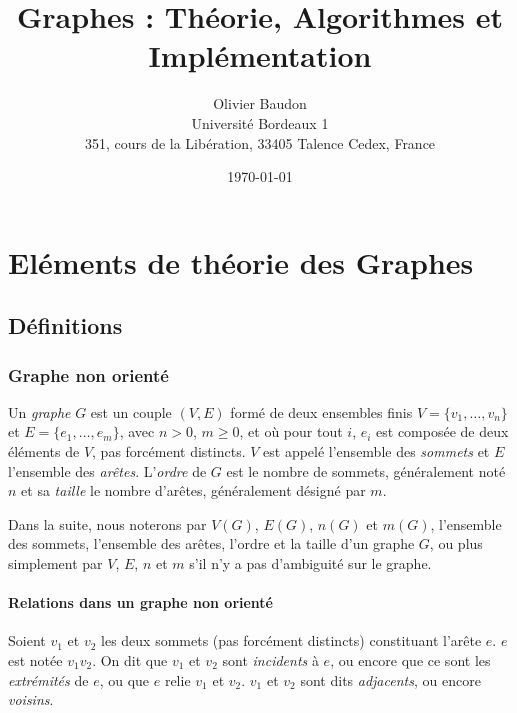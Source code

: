 \documentclass[11pt,a4paper]{report}
\title{Graphes : Théorie, Algorithmes et Implémentation}
\author{Olivier Baudon\\
Université Bordeaux 1\\ 
351, cours de la Libération, 33405 Talence Cedex, France}
\date{\today}
\begin{document}
\maketitle


\tableofcontents



\chapter{Eléments de théorie des Graphes}

\section{Définitions}

\subsection{Graphe non orienté}

Un {\em graphe} $G$ est un couple $(V, E)$ formé de deux ensembles finis $V = \{v_1, \ldots, v_n\}$ et $E = \{e_1, \ldots, e_m\}$, avec $n > 0$, $m \geq 0$, et où 
pour tout $i$, $e_i$ est composée de deux éléments de $V$, pas forcément distincts.
$V$ est appelé l'ensemble des 
{\em sommets} et $E$ l'ensemble des {\em ar\^etes}. L'{\em ordre} de $G$ est le nombre de sommets, généralement noté $n$ et sa {\em taille} le nombre d'arêtes, généralement désigné par $m$.

Dans la suite, nous noterons par $V(G)$, $E(G)$, $n(G)$ et $m(G)$, l'ensemble des sommets, l'ensemble des arêtes, l'ordre et la taille d'un graphe $G$, ou plus simplement par $V$, $E$, $n$ et $m$ s'il n'y a pas d'ambiguité sur le graphe.


\subsubsection{Relations dans un graphe non orienté}

Soient $v_1$ et $v_2$ les deux sommets (pas forcément distincts) constituant l'ar\^ete $e$. $e$ est notée $v_1v_2$. On dit que $v_1$ et $v_2$ sont
{\em incidents} \`a $e$, ou encore que ce sont les {\em extr\'emit\'es} de 
$e$, ou que $e$ relie $v_1$ et $v_2$. $v_1$ et $v_2$ sont dits {\em adjacents}, ou encore {\em voisins}.
\end{document}
